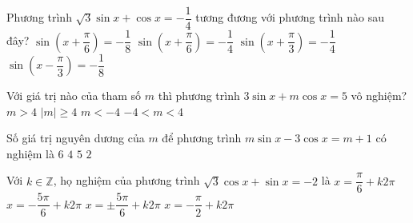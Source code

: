 \begin{ex}%
	Phương trình $\sqrt{3}\sin x+\cos x=-\dfrac{1}{4}$ tương đương với phương trình nào sau đây?
	\choice
	{\True $\sin \left(x+\dfrac{\pi }{6}\right)=-\dfrac{1}{8}$}
	{$\sin \left(x+\dfrac{\pi }{6}\right)=-\dfrac{1}{4}$}
	{$\sin \left(x+\dfrac{\pi }{3}\right)=-\dfrac{1}{4}$}
	{$\sin \left(x-\dfrac{\pi }{3}\right)=-\dfrac{1}{8}$}
\end{ex}

\begin{ex}%
Với giá trị nào của tham số $m$ thì phương trình $3\sin x+m\cos x=5$ vô nghiệm?
\choice
{$m>4$}
{$|m|\ge 4$}
{$m<-4$}
{\True $-4<m<4$}
\end{ex}


\begin{ex}%
Số giá trị nguyên dương của $ m$ để phương trình $ m\sin x-3\cos x=m+1$ có nghiệm là
\choice
{ $6$}
{\True $4$}
{ $5$}
{ $2$}
\end{ex}

\begin{ex}%
Với $k\in \mathbb{Z}$, họ nghiệm của phương trình $\sqrt{3}\cos x+\sin x=-2$ là
\choice
{$x=\dfrac{\pi}{6}+k2\pi$}
{\True $x=-\dfrac{5\pi}{6}+k2\pi$}
{$x=\pm \dfrac{5\pi}{6}+k2\pi$}
{$x=-\dfrac{\pi}{2}+k2\pi$}
\end{ex}

